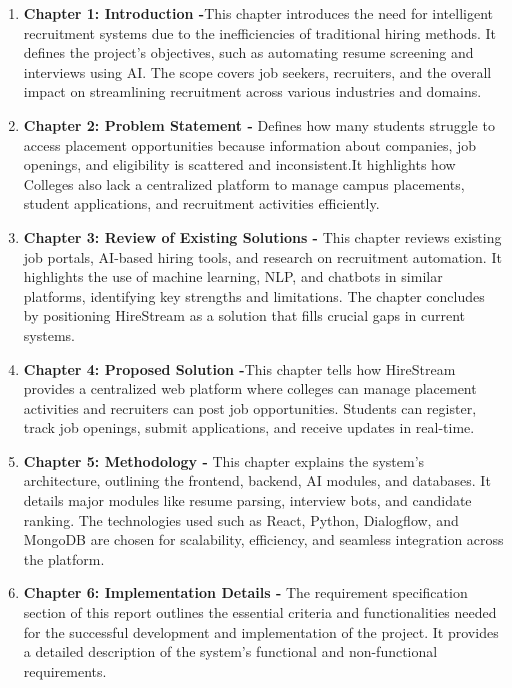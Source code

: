 \documentclass[a4paper, 12pt]{report}
\begin{document}
\begin{enumerate}[itemsep=-4pt, label=\textbf{\roman*.}]
    \item \textbf{Chapter 1: Introduction -}This chapter introduces the need for intelligent recruitment systems due to the inefficiencies of traditional hiring methods. It defines the project’s objectives, such as automating resume screening and interviews using AI. The scope covers job seekers, recruiters, and the overall impact on streamlining recruitment across various industries and domains.
    
    \item \textbf{Chapter 2: Problem Statement -} Defines how many students struggle to access placement opportunities because information about companies, job openings, and eligibility is scattered and inconsistent.It highlights how Colleges also lack a centralized platform to manage campus placements, student applications, and recruitment activities efficiently.
    
    \item \textbf{Chapter 3: Review of Existing Solutions -} This chapter reviews existing job portals, AI-based hiring tools, and research on recruitment automation. It highlights the use of machine learning, NLP, and chatbots in similar platforms, identifying key strengths and limitations. The chapter concludes by positioning HireStream as a solution that fills crucial gaps in current systems.
    
    \item \textbf{Chapter 4: Proposed Solution -}This chapter tells how HireStream provides a centralized web platform where colleges can manage placement activities and recruiters can post job opportunities. Students can register, track job openings, submit applications, and receive updates in real-time.
    
    \item \textbf{Chapter 5: Methodology -} This chapter explains the system’s architecture, outlining the frontend, backend, AI modules, and databases. It details major modules like resume parsing, interview bots, and candidate ranking. The technologies used such as React, Python, Dialogflow, and MongoDB are chosen for scalability, efficiency, and seamless integration across the platform.
    
    \item \textbf{Chapter 6: Implementation Details -} The requirement specification section of this report outlines the essential criteria and functionalities needed for the successful development and implementation of the project. It provides a detailed description of the system's functional and non-functional requirements.
    

\end{enumerate}
\end{document}
